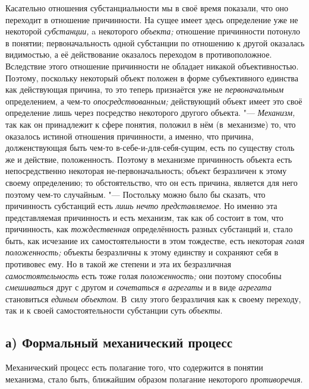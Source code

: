 Касательно отношения субстанциальности мы в своё время
показали, что оно переходит в отношение причинности. На сущее имеет здесь
определение уже не некоторой {\em субстанции,} a некоторого {\em объекта;}
отношение причинности потонуло в понятии; первоначальность
одной субстанции по отношению к другой оказалась видимостью, а её
действование оказалось переходом в противоположное. Вследствие этого
отношение причинности не обладает никакой объективностью. Поэтому,
поскольку некоторый объект положен в форме субъективного единства как
действующая причина, то это теперь признаётся уже не {\em первоначальным}
определением, а чем-то {\em опосредствованным;}
действующий объект имеет это своё определение лишь через
посредство некоторого другого объекта. "--- {\em Механизм,} так как он
принадлежит к сфере понятия, положил в нём (в~механизме) то, что оказалось
истиной отношения причинности, а именно, что причина, долженствующая быть
чем-то в-себе-и-для-себя-сущим, есть по существу столь же и действие,
положенность. Поэтому в механизме причинность объекта есть непосредственно
некоторая не-первоначальность; объект безразличен к этому своему
определению; то обстоятельство, что он есть причина, является для него
поэтому чем-то случайным. "--- Постольку можно было бы сказать,
что причинность субстанций есть {\em лишь нечто представляемое}.
Но именно эта представляемая причинность и есть механизм, так
как об состоит в том, что причинность, как {\em тождественная}
определённость разных субстанций и, стало быть, как исчезание
их самостоятельности в этом тождестве, есть некоторая {\em голая положенность;}
объекты безразличны к этому единству и сохраняют себя в
противовес ему. Но в такой же степени и эта их безразличная
{\em самостоятельность} есть тоже голая {\em положенность;} они
поэтому способны {\em смешиваться} друг с другом и {\em сочетаться в агрегаты}
и в виде {\em агрегата} становиться {\em единым
объектом}. В~силу этого безразличия как к своему переходу,
так и к своей самостоятельности субстанции суть {\em объекты}.

\subsection[а) Формальный механический процесс]{а) Формальный механический процесс}

Механический процесс есть полагание того, что содержится в понятии механизма,
стало быть, ближайшим образом полагание некоторого {\em противоречия}.

